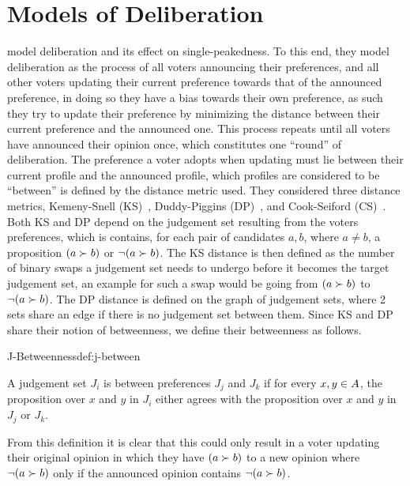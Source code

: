 \section{Models of Deliberation} \label{section:related_work} %
\citet{radDeliberationSinglePeakednessCoherent2021} model deliberation
and its effect on single-peakedness. To this end, they model deliberation as
the process of all voters announcing their preferences, and all other voters
updating their current preference towards that of the announced preference, in
doing so they have a bias towards their own preference, as such they try to
update their preference by minimizing the distance between their current
preference and the announced one. This process repeats until all voters have
announced their opinion once, which constitutes one ``round'' of deliberation.
The preference a voter adopts when updating must lie between their current
profile and the announced profile, which profiles are considered to be
``between'' is defined by the distance metric used. They considered three
distance metrics, Kemeny-Snell (KS)~\citep{kemeny1962preference}, Duddy-Piggins
(DP)~\citep{duddyMeasureDistanceJudgment2012}, and Cook-Seiford
(CS)~\citep{cookPriorityRankingConsensus1978}. Both KS and DP depend on the
judgement set resulting from the voters preferences, which is contains, for
each pair of candidates $a,b$, where $a \neq b$, a proposition $(a \succ b)$ or
$\neg (a \succ b)$. The KS distance is then defined as the number of binary
swaps a judgement set needs to undergo before it becomes the target judgement
set, an example for such a swap would be going from $(a \succ b)$ to $\neg (a
	\succ b)$. The DP distance is defined on the graph of judgement sets, where 2
sets share an edge if there is no judgement set between them. Since KS and DP
share their notion of betweenness, we define their betweenness as follows.

\begin{definition}{J-Betweenness}{def:j-between}

	A judgement set $J_i$ is between preferences $J_j$ and $J_k$ if for
	every $x,y \in A$, the proposition over $x$ and $y$ in
	$J_i$ either agrees with the proposition over $x$ and $y$ in $J_j$ or $J_k$.

\end{definition}

From this definition it is clear that this could only result in a voter
updating their original opinion in which they have $(a \succ b)$ to a new
opinion where $\neg (a\succ b)$ only if the announced opinion contains $\neg (a
	\succ b)$.


